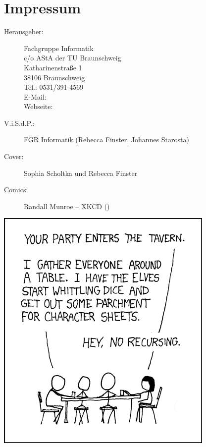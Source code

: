 \section{Impressum}
\label{impressum}
\begin{description}
\item[Herausgeber:]
	Fachgruppe Informatik\\
	c/o AStA der TU Braunschweig\\
	Katharinenstraße 1\\
	38106 Braunschweig\\
	Tel.: 0531/391-4569\\
	E-Mail: \\
	Webseite: \fginfoUrl
\item[V.i.S.d.P.:]  %
  FGR Informatik (Rebecca Finster, Johannes Starosta) 
\item[Cover:] Sophia Scholtka und Rebecca Finster
\item[Comics:] Randall Munroe -- XKCD ()
\end{description}
\begin{center}
		\includegraphics[totalheight=10cm]{bilder/XKCD/tabletop_roleplaying}
\end{center}